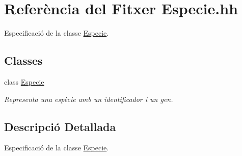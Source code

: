 \hypertarget{_especie_8hh}{}\section{Referència del Fitxer Especie.\+hh}
\label{_especie_8hh}


Especificació de la classe \hyperlink{class_especie}{Especie}.  


\subsection*{Classes}
\begin{DoxyCompactItemize}
\item 
class \hyperlink{class_especie}{Especie}
\begin{DoxyCompactList}\small\item\em Representa una espècie amb un identificador i un gen. \end{DoxyCompactList}\end{DoxyCompactItemize}


\subsection{Descripció Detallada}
Especificació de la classe \hyperlink{class_especie}{Especie}. 

